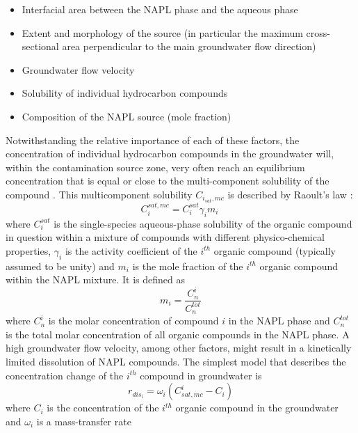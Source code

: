 \begin{itemize}
    \item Interfacial area between the NAPL phase and the aqueous phase
    \item Extent and morphology of the source (in particular the
maximum cross-sectional area perpendicular to the main groundwater
flow direction)
    \item Groundwater flow velocity
    \item Solubility of individual hydrocarbon compounds
    \item Composition of the NAPL source (mole fraction)
\end{itemize}

Notwithstanding the relative importance of each of these factors,
the concentration of individual hydrocarbon compounds in the
groundwater will, within the contamination source zone, very often
reach an equilibrium concentration that is equal or close to the
multi-component solubility of the compound \citep{eberhardt02}.
This multicomponent solubility $C_{i_{sat},mc}$ is described
by Raoult's law \citep{schwarzb}:
\begin{equation}
{C_{i}^{sat,mc} = C_{i}^{sat} \gamma_{i} m_{i} \ }
\label{eq:raoult2}
\end{equation}
where $C_{i}^{sat}$ is the single-species aqueous-phase
solubility
\citep[available from tabulated sources, e.g.,][]{schwarzb} 
of the organic compound in question within a
mixture of compounds with different physico-chemical properties,
$\gamma_{i}$ is the activity coefficient of the $i^{th}$ organic
compound (typically assumed to be unity) and $m_{i}$ is the
mole fraction of the $i^{th}$ organic compound within the NAPL
mixture. It is defined as
\begin{equation}
{m_i  = \frac {C_n^i} {C_n^{tot}}} \label{eq:raoult_mc}
\end{equation}
where $C_n^i$ is the molar concentration of compound $i$ in the
NAPL phase and $C_n^{tot}$ is the total molar concentration of all
organic compounds in the NAPL phase. A high groundwater flow
velocity, among other factors, might result in a kinetically
limited dissolution of NAPL compounds. The simplest model that
describes the concentration change of the $i^{th}$ compound in
groundwater is
\begin{equation}
{r_{dis_i} = \omega_i (C_{sat,mc}^i - C_i)}
\label{eq:raoult_dis}
\end{equation}
where $C_{i}$ is the concentration of the $i^{th}$ organic
compound in the groundwater and $\omega_i$ is a mass-transfer rate

